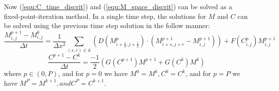 Now (\ref{equ:C_time_discrit}) and (\ref{equ:M_space_discrit}) can be solved as a fixed-point-iteration method.
In a single time step, the solutions for $M$ and $C$ can be solved using the previous time step solution in the follow manner:
\begin{equation} \label{equ:M_fixed_point}
  \frac{M^{p+1}_{i,j} - M^{k}_{i,j}}{\Delta t} = 
    \frac{1}{\Delta x^2} \sum_{(s,r) \in \mathbb{A}} \left( D(M^{p}_{i+\frac{s}{2}, j+\frac{r}{2}}) \cdot
    ( M^{p+1}_{i+s, j+r} - M^{p+1}_{i,j}) \right) + F(C^{p}_{i,j}) M^{p+1}_{i,j}
\end{equation}
\begin{equation} \label{equ:C_fixed_point}
  \frac{C^{p+1} - C^{k}}{\Delta t} = \frac{-1}{2} ( G(C^{p+1}) M^{p+1} + G(C^{k}) M^{k} )
\end{equation}
where $p \in (0,P)$, and for $p = 0$ we have $M^0 = M^{k}, C^0 = C^{k}$, and for $p = P$ we have $M^{P} = M^{k+1}, and C^{P} = C^{k+1}$.


